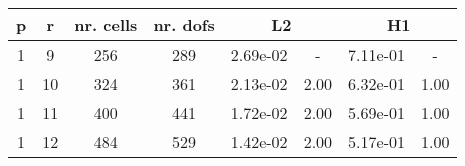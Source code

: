 \documentclass[10pt]{report}
\begin{document}
\begin{table}[H]
\begin{center}
\begin{tabular}{|c|c|c|c|c|c|c|c|} \hline
p & r & nr. cells & nr. dofs & 
\multicolumn{2}{|c|}{L2} & 
\multicolumn{2}{|c|}{H1}\\ \hline
1 & 9 & 256 & 289 & 2.69e-02 & - & 7.11e-01 & -\\ \hline
1 & 10 & 324 & 361 & 2.13e-02 & 2.00 & 6.32e-01 & 1.00\\ \hline
1 & 11 & 400 & 441 & 1.72e-02 & 2.00 & 5.69e-01 & 1.00\\ \hline
1 & 12 & 484 & 529 & 1.42e-02 & 2.00 & 5.17e-01 & 1.00\\ \hline
\end{tabular}
\end{center}
\end{table}
\end{document}
